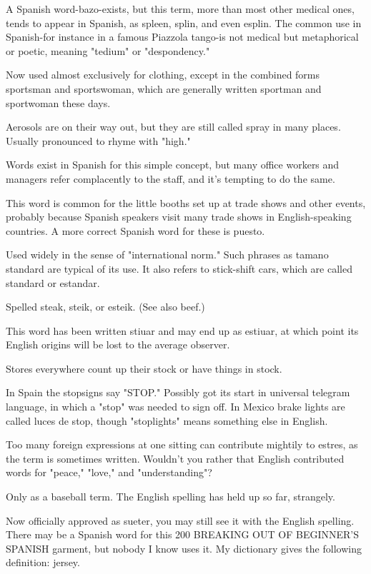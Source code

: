  A Spanish word-bazo-exists, but this term, more
than most other medical ones, tends to appear in Spanish, as spleen,
splin, and even esplin. The common use in Spanish-for instance in
a famous Piazzola tango-is not medical but metaphorical or poetic,
meaning "tedium" or "despondency."

 Now used almost exclusively for clothing, except in
the combined forms sportsman and sportswoman, which are generally
written sportman and sportwoman these days.

 Aerosols are on their way out, but they are still called
spray in many places. Usually pronounced to rhyme with "high."

 Words exist in Spanish for this simple concept, but
many office workers and managers refer complacently to the staff, and
it's tempting to do the same.

 This word is common for the little booths set up at
trade shows and other events, probably because Spanish speakers visit
many trade shows in English-speaking countries. A more correct Spanish word for these is puesto.

 Used widely in the sense of "international
norm." Such phrases as tamano standard are typical of its use. It
also refers to stick-shift cars, which are called standard or estandar.

 Spelled steak, steik, or esteik. (See also beef.)

 This word has been written stiuar and may end up
as estiuar, at which point its English origins will be lost to the average
observer.

 Stores everywhere count up their stock or have
things in stock.

 In Spain the stopsigns say "STOP." Possibly got its
start in universal telegram language, in which a "stop" was needed to
sign off. In Mexico brake lights are called luces de stop, though "stoplights" means something else in English.

 Too many foreign expressions at one sitting can
contribute mightily to estres, as the term is sometimes written.
Wouldn't you rather that English contributed words for "peace,"
"love," and "understanding"?

 Only as a baseball term. The English spelling has
held up so far, strangely.

 Now officially approved as sueter, you may still
see it with the English spelling. There may be a Spanish word for this
200 BREAKING OUT OF BEGINNER'S SPANISH
garment, but nobody I know uses it. My dictionary gives the following
definition: jersey.


